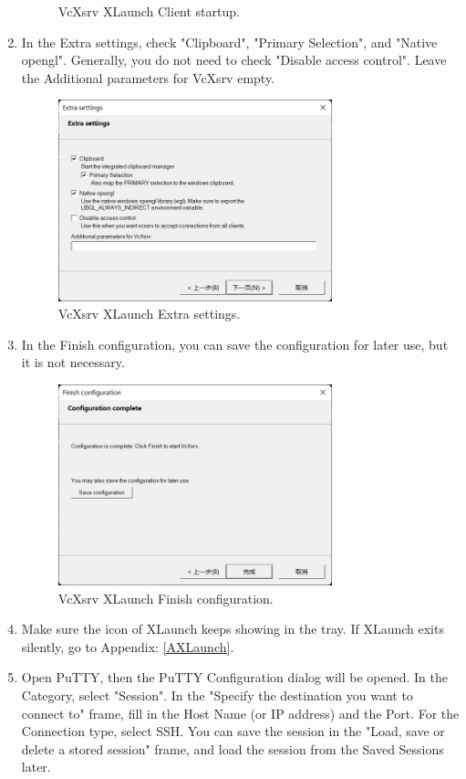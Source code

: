 \documentclass[a4paper,12pt,twoside]{article}
\begin{document}
\begin{enumerate}
\begin{figure}[H]
        \caption{VcXsrv XLaunch Client startup.}
    \end{figure}
    \item In the Extra settings, check "Clipboard", "Primary Selection", and "Native opengl". Generally, you do not need to check "Disable access control". Leave the Additional parameters for VcXsrv empty.
    \begin{figure}[H]
        \centering
        \includegraphics[width=0.75\textwidth]{images/3.png}
        \caption{VcXsrv XLaunch Extra settings.}
    \end{figure}
    \item In the Finish configuration, you can save the configuration for later use, but it is not necessary.
    \begin{figure}[H]
        \centering
        \includegraphics[width=0.75\textwidth]{images/4.png}
        \caption{VcXsrv XLaunch Finish configuration.}
    \end{figure}
    \item Make sure the icon of XLaunch keeps showing in the tray. If XLaunch exits silently, go to Appendix: \ref{AXLaunch}.
    \item Open PuTTY, then the PuTTY Configuration dialog will be opened. In the Category, select "Session". In the "Specify the destination you want to connect to" frame, fill in the Host Name (or IP address) and the Port. For the Connection type, select SSH. You can save the session in the "Load, save or delete a stored session" frame, and load the session from the Saved Sessions later.

\end{enumerate}
\end{document}
